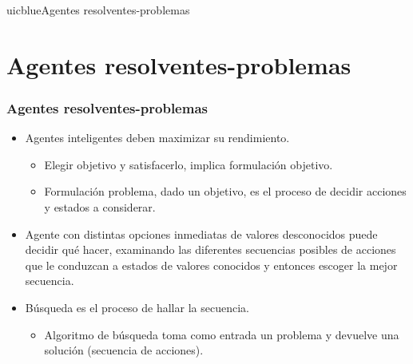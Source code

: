 \documentclass[xcolor=table]{beamer}
\begin{document}




\begin{chapter}{uicblue}{Agentes resolventes-problemas}
\end{chapter}

\section{Agentes resolventes-problemas}

\begin{frame} \frametitle{Agentes resolventes-problemas} \footnotesize

\begin{itemize}
\item Agentes inteligentes deben maximizar su rendimiento.

\begin{itemize}\footnotesize
\item Elegir objetivo y satisfacerlo, implica formulación objetivo.
\item Formulación problema, dado un objetivo, es el proceso de decidir acciones y estados a considerar.
\end{itemize}


\item Agente con distintas opciones inmediatas de valores desconocidos puede decidir qué hacer, examinando las diferentes secuencias posibles de acciones que le conduzcan a estados de valores conocidos y entonces escoger la mejor secuencia.


\item Búsqueda es el proceso de hallar la secuencia.

\begin{itemize}\footnotesize
\item Algoritmo de búsqueda toma como entrada un problema y devuelve una solución (secuencia de acciones).
\end{itemize}

\end{itemize}

\end{frame} 
\end{document}
